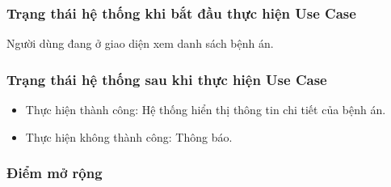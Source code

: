 \subsubsection{Trạng thái hệ thống khi bắt đầu thực hiện Use Case}
Người dùng đang ở giao diện xem danh sách bệnh án.

\subsubsection{Trạng thái hệ thống sau khi thực hiện Use Case}
\begin{itemize}
  \item Thực hiện thành công: Hệ thống hiển thị thông tin chi tiết của bệnh án.
  \item Thực hiện không thành công: Thông báo.
\end{itemize}

\subsubsection{Điểm mở rộng}